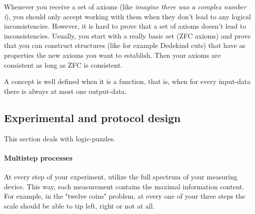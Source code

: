 Whenever you receive a set of axioms (like \emph{imagine there was a complex number i}), you should only accept working with them when they don't lead to any logical inconsistencies. However, it is hard to prove that a set of axioms doesn't lead to inconsistencies. Usually, you start with a really basic set (ZFC axioms) and prove that you can construct structures (like for example Dedekind cuts) that have as properties the new axioms you want to establish. Then your axioms are consistent as long as ZFC is consistent. 

A concept is well defined when it is a function, that is, when for every input-data there is always at most one output-data. 


\subsection{Experimental and protocol design}

This section deals with logic-puzzles. 

\paragraph{Multistep processes}
At every step of your experiment, utilize the full spectrum of your measuring device. This way, each measurement contains the maximal information content. For example, in the "twelve coins" problem, at every one of your three steps the scale should be able to tip left, right or not at all. 
